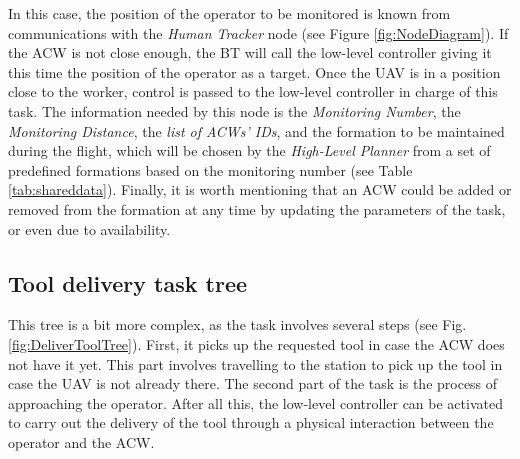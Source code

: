\documentclass[fontsize=11pt, English=false, Español=true, Myfinal=true, twoside, numbers=noenddot]{scrbook}
\begin{document}
{In this case, the position of the operator to be monitored is known from communications with the \emph{Human Tracker} node (see Figure \ref{fig:NodeDiagram}). If the \gls{ACW} is not close enough, the \gls{BT} will call the low-level controller giving it this time the position of the operator as a target. Once the \gls{UAV} is in a position close to the worker, control is passed to the low-level controller in charge of this task. The information needed by this node is the \emph{Monitoring Number}, the \emph{Monitoring Distance}, the \emph{list of \glspl{ACW}' \glspl{ID}}, and the formation to be maintained during the flight, which will be chosen by the \emph{High-Level Planner} from a set of predefined formations based on the monitoring number (see Table \ref{tab:shareddata}). Finally, it is worth mentioning that an \gls{ACW} could be added or removed from the formation at any time by updating the parameters of the task, or even due to availability.

\subsection{Tool delivery task tree}
\label{sec:ToolDeliveryTaskTree}
This tree is a bit more complex, as the task involves several steps (see Fig. \ref{fig:DeliverToolTree}). First, it picks up the requested tool in case the \gls{ACW} does not have it yet. This part involves travelling to the station to pick up the tool in case the \gls{UAV} is not already there. The second part of the task is the process of approaching the operator. After all this, the low-level controller can be activated to carry out the delivery of the tool through a physical interaction between the operator and the \gls{ACW}.

\begin{figure}[ht]
	\begin{center}
\end{center}
\end{figure}}
\end{document}
